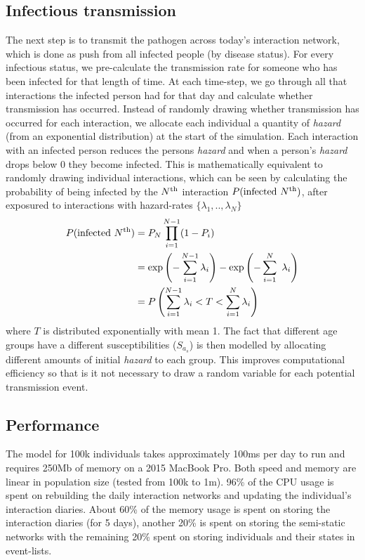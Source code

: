 \documentclass[12pt, oneside]{amsart}   	%
\begin{document}
\subsection{Infectious transmission}\label{section_ibm_implementation_disease}
The next step is to transmit the pathogen across today's interaction network, which is done as push from all infected people (by disease status).
For every infectious status, we pre-calculate the transmission rate for someone who has been infected for that length of time.
At each time-step, we go through all that interactions the infected person had for that day and calculate whether transmission has occurred.
Instead of randomly drawing whether transmission has occurred for each interaction, we allocate each individual a quantity of {\it hazard} (from an exponential distribution) at the start of the simulation.
Each interaction with an infected person reduces the persons {\it hazard} and when a person's {\it hazard} drops below 0 they become infected. 
This is mathematically equivalent to randomly drawing individual interactions, which can be seen by calculating the probability of  being infected by the $N^{\rm th}$ interaction  $P({\rm infected} \  N^{\rm th})$, after exposured to interactions with hazard-rates $\{ \lambda_1,..,\lambda_N \}$
\begin{align*}
P({\rm infected} \  N^{\rm th}) 
&= P_N \prod_{i=1}^{N-1} ( 1 - P_i) \\
&= \exp\left( -\sum_{i=1}^{N-1} \lambda_i \right) - \exp\left( -\sum_{i=1}^{N} \ \lambda_i\right) \\
&= P \left(  \sum_{i=1}^{N-1} \lambda_i  < T <  \sum_{i=1}^{N} \lambda_i \right)
\end{align*}
where $T$ is distributed exponentially with mean 1. 
The fact that different age groups have a different susceptibilities ($S_{a_s}$) is then modelled by allocating different amounts of initial {\it hazard} to each group.
This improves computational efficiency so that is it not necessary to draw a random variable for each potential transmission event.

\subsection{Performance} The model for 100k individuals takes approximately 100ms per day to run and requires 250Mb of memory on a 2015 MacBook Pro. 
Both speed and memory are linear in population size (tested from 100k to 1m). 
96\% of the CPU usage is spent on rebuilding the daily interaction networks and updating the individual's interaction diaries.
About 60\% of the memory usage is spent on storing the interaction diaries (for 5 days), another 20\% is spent on storing the semi-static networks with the remaining 20\% spent on storing individuals and their states in event-lists.


\newpage
\renewcommand{\bibname}{References}

 
\end{document}
